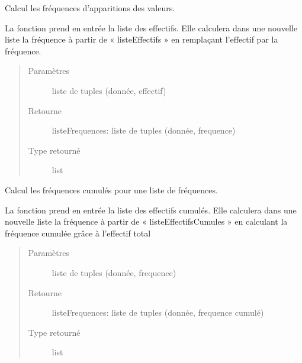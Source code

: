 \documentclass[letterpaper,10pt,openany,oneside,french]{sphinxmanual}
\begin{document}

\begin{fulllineitems}
\label{\detokenize{addQualitatives:add.addQualitatives.calculFrequences}}
Calcul les fréquences d’apparitions des valeurs.

La fonction prend en entrée la liste des effectifs. Elle calculera dans une nouvelle liste la fréquence à partir 
de « listeEffectifs » en remplaçant l’effectif par la fréquence.
\begin{quote}\begin{description}
\item[{Paramètres}] \leavevmode
{} \textendash{} liste de tuples (donnée, effectif)

\item[{Retourne}] \leavevmode
listeFrequences: liste de tuples (donnée, frequence)

\item[{Type retourné}] \leavevmode
list

\end{description}\end{quote}

\end{fulllineitems}


\begin{fulllineitems}
\label{\detokenize{addQualitatives:add.addQualitatives.calculFrequencesCumulees}}
Calcul les fréquences cumulés pour une liste de fréquences.

La fonction prend en entrée la liste des effectifs cumulés. Elle calculera dans une nouvelle liste la fréquence à partir 
de « listeEffectifsCumules » en calculant la fréquence cumulée grâce à l’effectif total
\begin{quote}\begin{description}
\item[{Paramètres}] \leavevmode
{} \textendash{} liste de tuples (donnée, frequence)

\item[{Retourne}] \leavevmode
listeFrequences: liste de tuples (donnée, frequence cumulé)

\item[{Type retourné}] \leavevmode
list

\end{description}\end{quote}

\end{fulllineitems}
\end{document}
